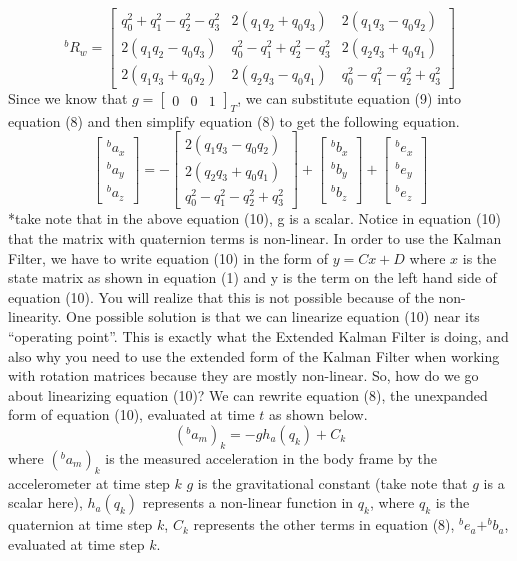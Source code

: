 \documentclass[a4paper,12pt]{book}
\begin{document}
\begin{equation}
    ^bR_w = \begin{bmatrix} q_0^2+q_1^2-q_2^2-q_3^2 & 2(q_1q_2+q_0q_3) & 2(q_1q_3-q_0q_2) \\ 2(q_1q_2-q_0q_3) & q_0^2-q_1^2+q_2^2-q_3^2 & 2(q_2q_3+q_0q_1) \\ 2(q_1q_3+q_0q_2) & 2(q_2q_3-q_0q_1) & q_0^2-q_1^2-q_2^2+q_3^2 \end{bmatrix}
\end{equation}
Since we know that $g=\begin{bmatrix} 0 &0 &1\end{bmatrix}_T$, we can substitute equation (9) into equation (8) and then simplify equation (8) to get the following equation.
\begin{equation}
    \begin{bmatrix} ^ba_x \\ ^ba_y \\ ^ba_z \end{bmatrix} = -\begin{bmatrix} 2(q_1q_3 - q_0q_2) \\ 2(q_2q_3 + q_0q_1) \\ q_0^2 - q_1^2 - q_2^2 + q_3^2 \end{bmatrix} + \begin{bmatrix} ^bb_x \\ ^bb_y \\ ^bb_z \end{bmatrix} + \begin{bmatrix} ^be_x \\ ^be_y \\ ^be_z \end{bmatrix}
\end{equation}
*take note that in the above equation (10), g is a scalar. Notice in equation (10) that the matrix with quaternion terms is non-linear. In order to use the Kalman Filter, we have to write equation (10) in the form of $y=Cx+D$ where $x$ is the state matrix as shown in equation (1) and y is the term on the left hand side of equation (10). You will realize that this is not possible because of the non-linearity. One possible solution is that we can linearize equation (10) near its “operating point”. This is exactly what the Extended Kalman Filter is doing, and also why you need to use the extended form of the Kalman Filter when working with rotation matrices because they are mostly non-linear. So, how do we go about linearizing equation (10)? We can rewrite equation (8), the unexpanded form of equation (10), evaluated at time $t$ as shown below.
\begin{equation}
    (^ba_m)_k = -gh_a(q_k) + C_k
\end{equation}
where $(^ba_m)_k$ is the measured acceleration in the body frame by the accelerometer at time step $k$
$g$ is the gravitational constant (take note that $g$ is a scalar here), $h_a(q_k)$ represents a non-linear function in $q_k$, where $q_k$ is the quaternion at time step $k$, $C_k$ represents the other terms in equation (8), $^be_a+^bb_a$, evaluated at time step $k$.
\end{document}
